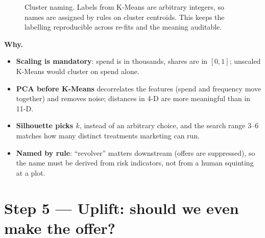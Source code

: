 \documentclass[11pt,a4paper]{article}
\newcommand{\why}[1]{\par\needspace{6\baselineskip}\smallskip\noindent\textbf{\textcolor{ca}{Why.}} #1\par}
\begin{document}
\begin{figure}[h]
\centering
{}
\caption{Cluster naming. Labels from K-Means are arbitrary integers, so names are assigned by rules on cluster
centroids. This keeps the labelling reproducible across re-fits and the meaning auditable.}
\label{fig:naming}
\end{figure}

\why{
\begin{itemize}
\item \textbf{Scaling is mandatory}: spend is in thousands, shares are in $[0,1]$; unscaled K-Means would cluster on spend alone.
\item \textbf{PCA before K-Means} decorrelates the features (spend and frequency move together) and removes noise; distances in 4-D are more meaningful than in 11-D.
\item \textbf{Silhouette picks $k$}, instead of an arbitrary choice, and the search range 3--6 matches how many distinct treatments marketing can run.
\item \textbf{Named by rule}: ``revolver'' matters downstream (offers are suppressed), so the name must be derived from risk indicators, not from a human squinting at a plot.
\end{itemize}}

\section{Step 5 --- Uplift: should we even make the offer?}
\end{document}
